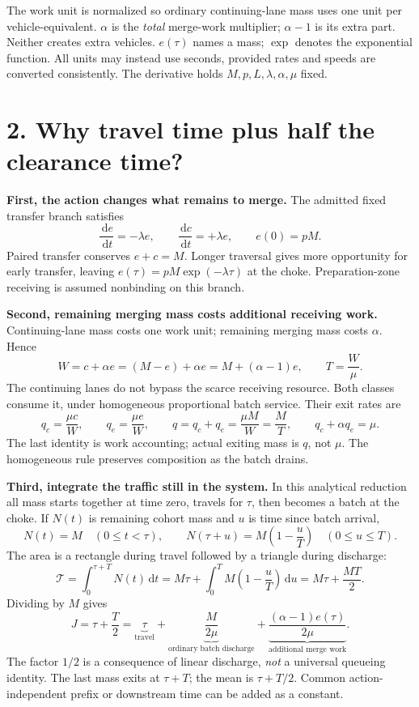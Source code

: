 \documentclass[11pt]{article}
\newcommand{\dd}{\,\mathrm{d}}
\begin{document}
The work unit is normalized so ordinary continuing-lane mass uses one unit per
vehicle-equivalent. \(\alpha\) is the \emph{total} merge-work multiplier;
\(\alpha-1\) is its extra part. Neither creates extra vehicles.
\(e(\tau)\) names a mass; \(\exp\) denotes the exponential function.
All units may instead use seconds, provided rates and speeds are converted
consistently. The derivative holds \(M,p,L,\lambda,\alpha,\mu\) fixed.

\newpage
\section*{2. Why travel time plus half the clearance time?}
\textbf{First, the action changes what remains to merge.}
The admitted fixed transfer branch satisfies
\[
 \frac{\dd e}{\dd t}=-\lambda e,
 \qquad \frac{\dd c}{\dd t}=+\lambda e,
 \qquad e(0)=pM.
\]
Paired transfer conserves \(e+c=M\). Longer traversal gives more opportunity
for early transfer, leaving \(e(\tau)=pM\exp(-\lambda\tau)\) at the choke.
Preparation-zone receiving is assumed nonbinding on this branch.

\textbf{Second, remaining merging mass costs additional receiving work.}
Continuing-lane mass costs one work unit; remaining merging mass costs
\(\alpha\). Hence
\[
 W=c+\alpha e=(M-e)+\alpha e=M+(\alpha-1)e,
 \qquad T=\frac{W}{\mu}.
\]
The continuing lanes do not bypass the scarce receiving resource. Both classes
consume it, under homogeneous proportional batch service. Their exit rates are
\[
 q_c=\frac{\mu c}{W},\qquad q_e=\frac{\mu e}{W},\qquad
 q=q_c+q_e=\frac{\mu M}{W}=\frac{M}{T},\qquad
 q_c+\alpha q_e=\mu.
\]
The last identity is work accounting; actual exiting mass is \(q\), not
\(\mu\). The homogeneous rule preserves composition as the batch drains.

\textbf{Third, integrate the traffic still in the system.}
In this analytical reduction all mass starts together at time zero, travels
for \(\tau\), then becomes a batch at the choke. If \(N(t)\) is remaining
cohort mass and \(u\) is time since batch arrival,
\[
 N(t)=M\quad(0\le t<\tau),\qquad
 N(\tau+u)=M\left(1-\frac{u}{T}\right)\quad(0\le u\le T).
\]
The area is a rectangle during travel followed by a triangle during discharge:
\[
 \mathcal T=\int_0^{\tau+T}N(t)\dd t
   =M\tau+\int_0^T M\left(1-\frac{u}{T}\right)\dd u
   =M\tau+\frac{MT}{2}.
\]
Dividing by \(M\) gives
\[
 \boxed{J=\tau+\frac{T}{2}
 =\underbrace{\tau}_{\text{travel}}
 +\underbrace{\frac{M}{2\mu}}_{\text{ordinary batch discharge}}
 +\underbrace{\frac{(\alpha-1)e(\tau)}{2\mu}}_{\text{additional merge work}}.}
\]
The factor \(1/2\) is a consequence of linear discharge, \emph{not} a universal
queueing identity. The last mass exits at \(\tau+T\); the mean is \(\tau+T/2\).
Common action-independent prefix or downstream time can be added as a constant.
\end{document}
